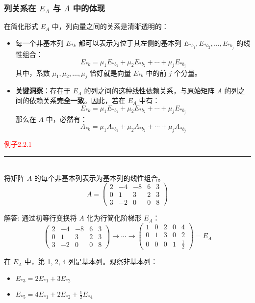 \subsubsection{列关系在 \( E_A \) 与 \( A \) 中的体现}

在简化形式 \( E_A \) 中，列向量之间的关系是清晰透明的：
\begin{itemize}
    \item 每一个非基本列 \( E_{*k} \) 都可以表示为位于其左侧的基本列 \( E_{*b_1}, E_{*b_2}, \dots, E_{*b_j} \) 的线性组合：
    \[
    E_{*k} = \mu_1 E_{*b_1} + \mu_2 E_{*b_2} + \cdots + \mu_j E_{*b_j}
    \]
    其中，系数 \( \mu_1, \mu_2, \dots, \mu_j \) 恰好就是向量 \( E_{*k} \) 中的前 \( j \) 个分量。
    
    \item \textbf{关键洞察}：存在于 \( E_A \) 的列之间的这种线性依赖关系，与原始矩阵 \( A \) 的列之间的依赖关系\textbf{完全一致}。因此，若在 \( E_A \) 中有：
    \[
    E_{*k} = \mu_1 E_{*b_1} + \mu_2 E_{*b_2} + \cdots + \mu_j E_{*b_j}
    \]
    那么在 \( A \) 中，必然有：
    \[
    A_{*k} = \mu_1 A_{*b_1} + \mu_2 A_{*b_2} + \cdots + \mu_j A_{*b_j}
    \]
\end{itemize}

\textcolor{red}{例子2.2.1}
\color{red}\rule{\textwidth}{0.4pt}\color{black}\\
将矩阵 \( A \) 的每个非基本列表示为基本列的线性组合。
\[
A = \begin{pmatrix}
2 & -4 & -8 & 6 & 3 \\
0 & 1 & 3 & 2 & 3 \\
3 & -2 & 0 & 0 & 8
\end{pmatrix}
\]

解答:
通过初等行变换将 \( A \) 化为行简化阶梯形 \( E_A \)：
\[
\begin{pmatrix}
2 & -4 & -8 & 6 & 3 \\
0 & 1 & 3 & 2 & 3 \\
3 & -2 & 0 & 0 & 8
\end{pmatrix}
\rightarrow \cdots \rightarrow
\begin{pmatrix}
1 & 0 & 2 & 0 & 4 \\
0 & 1 & 3 & 0 & 2 \\
0 & 0 & 0 & 1 & \frac{1}{2}
\end{pmatrix} = E_A
\]

在 \( E_A \) 中，第 1, 2, 4 列是基本列。观察非基本列：
\begin{itemize}
    \item \( E_{*3} = 2E_{*1} + 3E_{*2} \)
    \item \( E_{*5} = 4E_{*1} + 2E_{*2} + \frac{1}{2}E_{*4} \)
\end{itemize}

